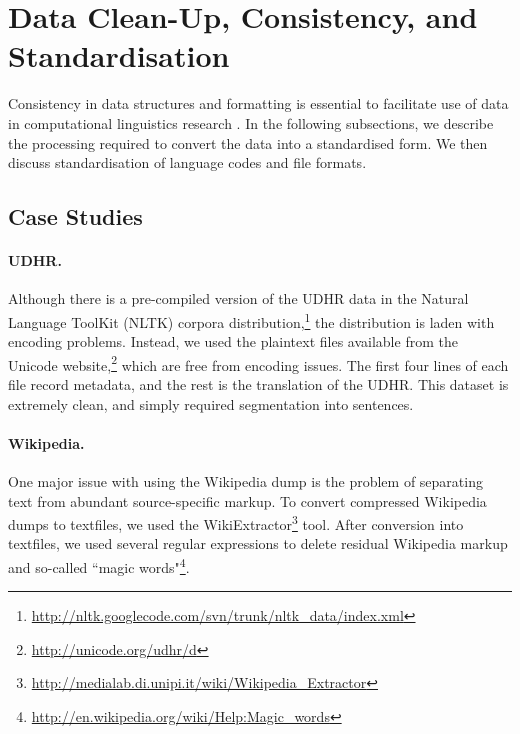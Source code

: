 \section{Data Clean-Up, Consistency, and Standardisation} \label{sec:case_studies}
Consistency in data structures and formatting is essential to facilitate use of data in computational linguistics research \cite{palmer2010lilt}. In the following subsections, we describe the processing required to convert the data into a standardised form.  We then discuss standardisation of language codes and file formats.

\subsection{Case Studies}


\paragraph{UDHR.} Although there is a pre-compiled version of the UDHR data in the Natural Language ToolKit (NLTK) corpora distribution,\footnote{\url{http://nltk.googlecode.com/svn/trunk/nltk_data/index.xml}}
the distribution is laden with encoding problems. Instead, we used the plaintext files available from the Unicode website,\footnote{\url{http://unicode.org/udhr/d}} which are free from encoding issues. The first four lines of each file record metadata, and the rest is the translation of the UDHR. This dataset is extremely clean, and simply required segmentation into sentences.


\paragraph{Wikipedia.}
One major issue with using the Wikipedia dump is the problem of separating text from abundant source-specific markup. To convert compressed Wikipedia dumps to textfiles, we used the WikiExtractor\footnote{\url{http://medialab.di.unipi.it/wiki/Wikipedia_Extractor}} tool. After conversion into textfiles, we used several regular expressions to delete residual Wikipedia markup and so-called ``magic words"\footnote{\url{http://en.wikipedia.org/wiki/Help:Magic_words}}.


